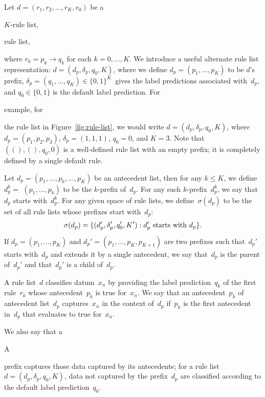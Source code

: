 \documentclass[twoside,11pt]{article}
\def\RL{{d}}
\def\Prefix{d_p}
\def\Labels{\delta_p}
\def\Default{q_0}
\def\StartsWith{\sigma}
\begin{document}
Let ${\RL = (r_1, r_2, \dots, r_K, r_0)}$ be a
\begin{arxiv}
$K$-rule list,
\end{arxiv}
\begin{kdd}
rule list,
\end{kdd}
where ${r_k = p_k \rightarrow q_k}$ for each ${k = 0, \dots, K}$.
%
We introduce a useful alternate rule list representation:
${\RL = (\Prefix, \Labels, \Default, K)}$,
where we define ${\Prefix = (p_1, \dots, p_K)}$ to be $\RL$'s prefix,
${\Labels = (q_1, \dots, q_K) \in \{0, 1\}^K}$~gives
the label predictions associated with~$\Prefix$,
and ${\Default \in \{0, 1\}}$ is the default label prediction.
%
For
\begin{arxiv}
example, for
\end{arxiv}
the rule list in Figure~\ref{fig:rule-list},
we would write ${\RL = (\Prefix, \Labels, \Default, K)}$,
where ${\Prefix = (p_1, p_2, p_3)}$, ${\Labels = (1, 1, 1)}$,
${\Default = 0}$, and ${K=3}$.
%
Note that ${((), (), q_0, 0)}$ is a well-defined rule list with an empty prefix;
it is completely defined by a single default rule.

Let ${\Prefix = (p_1, \dots, p_k, \dots, p_K)}$ be an antecedent list,
then for any ${k \le K}$, we define ${\Prefix^k =}$ ${(p_1, \dots, p_k)}$
to be the $k$-prefix of~$\Prefix$.
%
For any such $k$-prefix~$\Prefix^k$,
we say that~$\Prefix$ starts with~$\Prefix^k$.
%
For any given space of rule lists,
we define~$\StartsWith(\Prefix)$ to be the set of
all rule lists whose prefixes start with~$\Prefix$:
\begin{align}
\StartsWith(\Prefix) =
\{(\Prefix', \Labels', \Default', K') : \Prefix' \textnormal{ starts with } \Prefix \}.
\label{eq:starts-with}
\end{align}
%
If ${\Prefix = (p_1, \dots, p_K)}$ and ${\Prefix' = (p_1, \dots, p_K, p_{K+1})}$
are two prefixes such that~$\Prefix'$ starts with~$\Prefix$ and extends it by
a single antecedent, we say that~$\Prefix$ is the parent of~$\Prefix'$
and that~$\Prefix'$ is a child of~$\Prefix$.

A rule list~$\RL$ classifies datum~$x_n$ by providing the label prediction~$q_k$
of the first rule~$r_k$ whose antecedent~$p_k$ is true for~$x_n$.
%
We say that an antecedent~$p_k$ of antecedent list~$\Prefix$ captures~$x_n$
in the context of~$\Prefix$ if~$p_k$ is the first antecedent in~$\Prefix$ that
evaluates to true for~$x_n$.
%
\begin{arxiv}
We also say that a
\end{arxiv}
\begin{kdd}
A
\end{kdd}
prefix captures those data captured by its antecedents;
for a rule list~${\RL = (\Prefix, \Labels, \Default, K)}$,
data not captured by the prefix~$\Prefix$
are classified according to the default label prediction~$\Default$.
\end{document}
